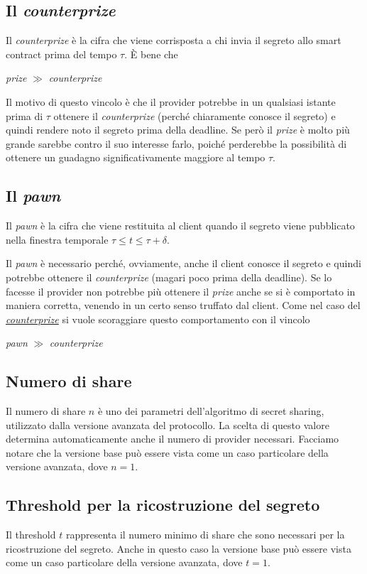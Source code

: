 \subsection{Il \textit{counterprize}}
\label{subsec:counterprize}
Il \textit{counterprize} è la cifra che viene corrisposta a chi invia il segreto
allo smart contract prima del tempo $ \tau $. È bene che
\begin{center}
	\textit{prize} $ \gg $ \textit{counterprize}
\end{center}
Il motivo di questo vincolo è che il provider potrebbe in un qualsiasi istante
prima di $ \tau $ ottenere
il \textit{counterprize} (perché chiaramente conosce il segreto) e quindi
rendere noto il segreto prima della deadline. Se però il
\textit{prize} è molto più grande sarebbe contro il suo
interesse farlo,
poiché perderebbe la possibilità di ottenere un guadagno significativamente
maggiore al tempo $ \tau $.

\subsection{Il \textit{pawn}}
Il \textit{pawn} è la cifra che viene restituita al client quando il segreto
viene pubblicato nella finestra temporale $ \tau \leq t \leq \tau + \delta $.

Il \textit{pawn} è necessario perché, ovviamente, anche il client conosce il segreto
e quindi potrebbe ottenere il \textit{counterprize} (magari poco prima della deadline).
Se lo facesse il provider non potrebbe più ottenere il \textit{prize} anche se si è
comportato in maniera corretta, venendo in un certo senso truffato dal client.
Come nel caso del \hyperref[subsec:counterprize]{\textit{counterprize}}
si vuole scoraggiare questo comportamento con il vincolo
\begin{center}
	\textit{pawn} $ \gg $ \textit{counterprize}
\end{center}

\subsection{Numero di share}
Il numero di share $ n $ è uno dei parametri
dell'algoritmo di secret sharing, utilizzato dalla versione
avanzata del protocollo.
La scelta di questo valore determina automaticamente anche il numero di provider
necessari.
Facciamo notare che la versione base può essere vista come un caso particolare
della versione avanzata, dove $ n = 1 $.

\subsection{Threshold per la ricostruzione del segreto}
Il threshold $ t $ rappresenta il numero minimo di share che
sono necessari per la ricostruzione del segreto.
Anche in questo caso la versione base può essere vista come un caso particolare
della versione avanzata, dove $ t = 1 $.

